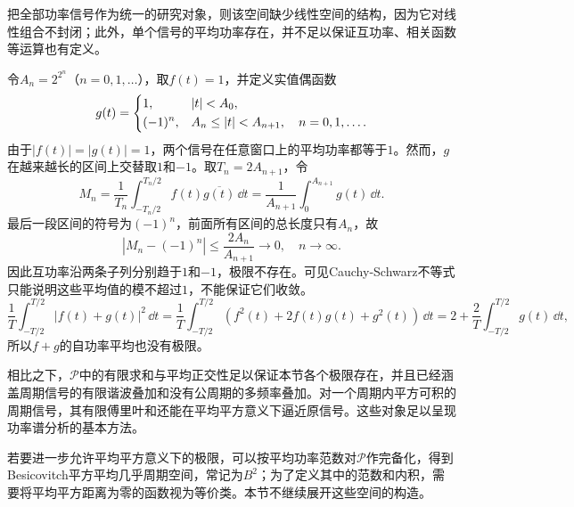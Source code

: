 把全部功率信号作为统一的研究对象，则该空间缺少线性空间的结构，因为它对线性组合不封闭；此外，单个信号的平均功率存在，并不足以保证互功率、相关函数等运算也有定义。

\begin{example}
    令$A_n=2^{2^n}$（$n=0,1,\ldots$），取$f(t)=1$，并定义实值偶函数
    \begin{equation}
        g(t)=
        \begin{dcases}
            1,      & |t|<A_0,                              \\
            (-1)^n, & A_n\le|t|<A_{n+1},\quad n=0,1,\ldots.
        \end{dcases}
    \end{equation}
    由于$|f(t)|=|g(t)|=1$，两个信号在任意窗口上的平均功率都等于$1$。然而，$g$在越来越长的区间上交替取$1$和$-1$。取$T_n=2A_{n+1}$，令
    \begin{equation}
        M_n=\frac{1}{T_n}\int_{-T_n/2}^{T_n/2}f(t)\overline{g(t)}\,\dd t=\frac{1}{A_{n+1}}\int_0^{A_{n+1}}g(t)\,\dd t.
    \end{equation}
    最后一段区间的符号为$(-1)^n$，前面所有区间的总长度只有$A_n$，故
    \begin{equation}
        |M_n-(-1)^n|\le\frac{2A_n}{A_{n+1}}\to 0,\quad n\to\infty.
    \end{equation}
    因此互功率沿两条子列分别趋于$1$和$-1$，极限不存在。可见Cauchy-Schwarz不等式只能说明这些平均值的模不超过$1$，不能保证它们收敛。
    \begin{equation}
        \frac{1}{T}\int_{-T/2}^{T/2}|f(t)+g(t)|^2\,\dd t=\frac{1}{T}\int_{-T/2}^{T/2}(f^2(t)+2f(t)g(t)+g^2(t))\,\dd t=2+\frac{2}{T}\int_{-T/2}^{T/2}g(t)\,\dd t,
    \end{equation}
    所以$f+g$的自功率平均也没有极限。
\end{example}

相比之下，$\mathcal{P}$中的有限求和与平均正交性足以保证本节各个极限存在，并且已经涵盖周期信号的有限谐波叠加和没有公周期的多频率叠加。对一个周期内平方可积的周期信号，其有限傅里叶和还能在平均平方意义下逼近原信号。这些对象足以呈现功率谱分析的基本方法。

若要进一步允许平均平方意义下的极限，可以按平均功率范数对$\mathcal{P}$作完备化，得到Besicovitch平方平均几乎周期空间，常记为$B^2$；为了定义其中的范数和内积，需要将平均平方距离为零的函数视为等价类。本节不继续展开这些空间的构造。
